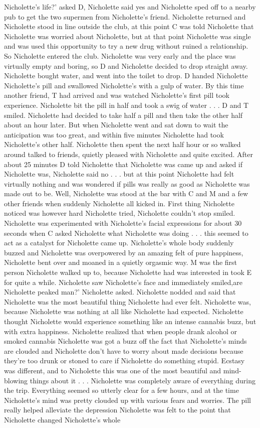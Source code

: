 \documentclass[12pt]{book}
\begin{document}
Nicholette's life?' asked D, Nicholette said yes and Nicholette sped off to a nearby pub to get the two supermen from Nicholette's friend. Nicholette returned and Nicholette stood in line outside the club, at this point C was told Nicholette that Nicholette was worried about Nicholette, but at that point Nicholette was single and was used this opportunity to try a new drug without ruined a relationship. So Nicholette entered the club. Nicholette was very early and the place was virtually empty and boring, so D and Nicholette decided to drop straight away. Nicholette bought water, and went into the toilet to drop. D handed Nicholette Nicholette's pill and swallowed Nicholette's with a gulp of water. By this time another friend, T had arrived and was watched Nicholette's first pill took experience. Nicholette bit the pill in half and took a swig of water . . .  D and T smiled. Nicholette had decided to take half a pill and then take the other half about an hour later. But when Nicholette went and sat down to wait the anticipation was too great, and within five minutes Nicholette had took Nicholette's other half. Nicholette then spent the next half hour or so walked around talked to friends, quietly pleased with Nicholette and quite excited. After about 25 minutes D told Nicholette that Nicholette was came up and asked if Nicholette was, Nicholette said no . . .  but at this point Nicholette had felt virtually nothing and was wondered if pills was really as good as Nicholette was made out to be. Well, Nicholette was stood at the bar with C and M and a few other friends when suddenly Nicholette all kicked in. First thing Nicholette noticed was however hard Nicholette tried, Nicholette couldn't stop smiled. Nicholette was experimented with Nicholette's facial expressions for about 30 seconds when C asked Nicholette what Nicholette was doing . . .  this seemed to act as a catalyst for Nicholette came up. Nicholette's whole body suddenly buzzed and Nicholette was overpowered by an amazing felt of pure happiness, Nicholette bent over and moaned in a quietly orgasmic way. M was the first person Nicholette walked up to, because Nicholette had was interested in took E for quite a while. Nicholette saw Nicholette's face and immediately smiled,are Nicholette peaked man?' Nicholette asked. Nicholette nodded and said that Nicholette was the most beautiful thing Nicholette had ever felt. Nicholette was, because Nicholette was nothing at all like Nicholette had expected. Nicholette thought Nicholette would experience something like an intense cannabis buzz, but with extra happiness. Nicholette realized that when people drank alcohol or smoked cannabis Nicholette was got a buzz off the fact that Nicholette's minds are clouded and Nicholette don't have to worry about made decisions because they're too drunk or stoned to care if Nicholette do something stupid. Ecstasy was different, and to Nicholette this was one of the most beautiful and mind-blowing things about it . . .  Nicholette was completely aware of everything during the trip. Everything seemed so utterly clear for a few hours, and at the time Nicholette's mind was pretty clouded up with various fears and worries. The pill really helped alleviate the depression Nicholette was felt to the point that Nicholette changed Nicholette's whole 
\end{document}
